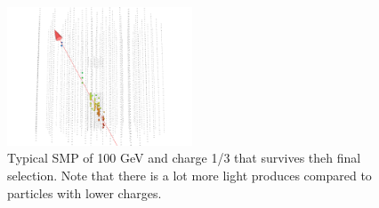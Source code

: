 \begin{appendices}
\begin{figure}
\centering
\includegraphics[width=0.49\textwidth]{appendix/img/FINAL_signal_m_100_ch2ovr3.png}
\caption{Typical SMP of 100 GeV and charge 1/3 that survives theh final selection. Note that there is a lot more light produces compared to particles with lower charges.}
\label{fig:final_4}
\end{figure}

\end{appendices}